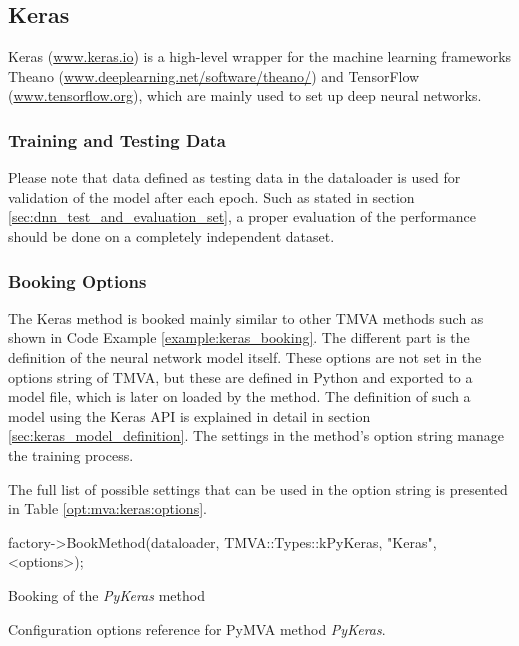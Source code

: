 \subsection{Keras}
\label{sec:keras}

Keras (\url{www.keras.io}) is a high-level wrapper for the machine learning frameworks Theano (\url{www.deeplearning.net/software/theano/}) and TensorFlow (\url{www.tensorflow.org}), which are mainly used to set up deep neural networks.

\subsubsection{Training and Testing Data}

Please note that data defined as testing data in the dataloader is used for validation of the model after each epoch. Such as stated in section \ref{sec:dnn_test_and_evaluation_set}, a proper evaluation of the performance should be done on a completely independent dataset.

\subsubsection{Booking Options}

The Keras method is booked mainly similar to other TMVA methods such as shown in Code Example \ref{example:keras_booking}. The different part is the definition of the neural network model itself. These options are not set in the options string of TMVA, but these are defined in Python and exported to a model file, which is later on loaded by the method. The definition of such a model using the Keras API is explained in detail in section \ref{sec:keras_model_definition}. The settings in the method's option string manage the training process.

The full list of possible settings that can be used in the option string is presented in Table \ref{opt:mva:keras:options}.

\begin{codeexample}
\begin{tmvacode}
factory->BookMethod(dataloader, TMVA::Types::kPyKeras, "Keras", <options>);
\end{tmvacode}
\caption[.]{\codeexampleCaptionSize Booking of the \textit{PyKeras} method}
\label{example:keras_booking}
\end{codeexample}

\begin{option}[h]

\caption[.]{\optionCaptionSize
     Configuration options reference for PyMVA method \textit{PyKeras}.
}
\label{opt:mva:keras:options}
\end{option}

